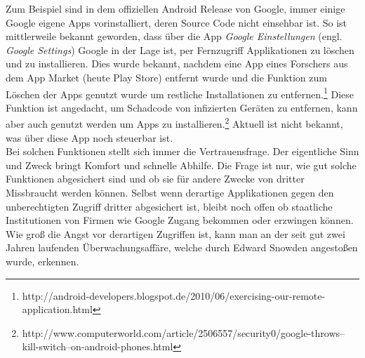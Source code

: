 Zum Beispiel sind in dem offiziellen Android Release von Google, immer einige Google eigene Apps vorinstalliert, deren Source Code nicht einsehbar ist. So ist mittlerweile bekannt geworden, dass über die App \textit{Google Einstellungen} (engl. \textit{Google Settings}) Google in der Lage ist, per Fernzugriff Applikationen zu löschen und zu installieren. Dies wurde bekannt, nachdem eine App eines Forschers aus dem App Market (heute Play Store) entfernt wurde und die Funktion zum Löschen der Apps genutzt wurde um restliche Installationen zu entfernen.\footnote{http://android-developers.blogspot.de/2010/06/exercising-our-remote-application.html} 
Diese Funktion ist angedacht, um Schadcode von infizierten Geräten zu entfernen, kann aber auch genutzt werden um Apps zu installieren.\footnote{http://www.computerworld.com/article/2506557/security0/google-throws--kill-switch--on-android-phones.html} Aktuell ist nicht bekannt, was über diese App noch steuerbar ist.\\
Bei solchen Funktionen stellt sich immer die Vertrauensfrage. Der eigentliche Sinn und Zweck bringt Komfort und schnelle Abhilfe. Die Frage ist nur, wie gut solche Funktionen abgesichert sind und ob sie für andere Zwecke von dritter Missbraucht werden können. Selbst wenn derartige Applikationen gegen den unberechtigten Zugriff dritter abgesichert ist, bleibt noch offen ob staatliche Institutionen von Firmen wie Google Zugang bekommen oder erzwingen können. Wie groß die Angst vor derartigen Zugriffen ist, kann man an der seit gut zwei Jahren laufenden Überwachungsaffäre, welche durch Edward Snowden angestoßen wurde, erkennen.